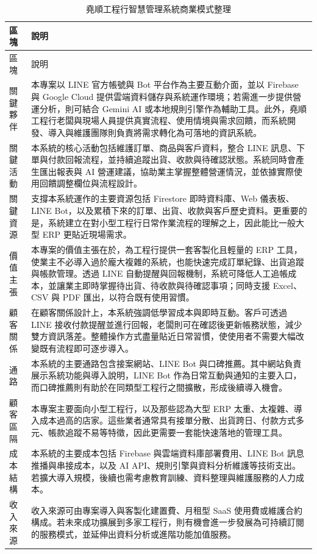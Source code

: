 \documentclass[12pt,a4paper,UTF8,fontset=none]{ctexart}
\begin{document}
\begin{longtable}{L{3.2cm}L{10.5cm}}
  \caption{堯順工程行智慧管理系統商業模式整理} \\
  \toprule
  區塊 & 說明 \\
  \midrule
  \endfirsthead
  \toprule
  區塊 & 說明 \\
  \midrule
  \endhead
  關鍵夥伴 &
  本專案以 LINE 官方帳號與 Bot 平台作為主要互動介面，並以 Firebase 與 Google Cloud 提供雲端資料儲存與系統運作環境；若需進一步提供營運分析，則可結合 Gemini AI 或本地規則引擎作為輔助工具。此外，堯順工程行老闆與現場人員提供真實流程、使用情境與需求回饋，而系統開發、導入與維護團隊則負責將需求轉化為可落地的資訊系統。 \\
  關鍵活動 &
  本系統的核心活動包括維護訂單、商品與客戶資料，整合 LINE 訊息、下單與付款回報流程，並持續追蹤出貨、收款與待確認狀態。系統同時會產生匯出報表與 AI 營運建議，協助業主掌握整體營運情況，並依據實際使用回饋調整欄位與流程設計。 \\
  關鍵資源 &
  支撐本系統運作的主要資源包括 Firestore 即時資料庫、Web 儀表板、LINE Bot，以及累積下來的訂單、出貨、收款與客戶歷史資料。更重要的是，系統建立在對小型工程行日常作業流程的理解之上，因此能比一般大型 ERP 更貼近現場需求。 \\
  價值主張 &
  本專案的價值主張在於，為工程行提供一套客製化且輕量的 ERP 工具，使業主不必導入過於龐大複雜的系統，也能快速完成訂單紀錄、出貨追蹤與帳款管理。透過 LINE 自動提醒與回報機制，系統可降低人工追帳成本，並讓業主即時掌握待出貨、待收款與待確認事項；同時支援 Excel、CSV 與 PDF 匯出，以符合既有使用習慣。 \\
  顧客關係 &
  在顧客關係設計上，本系統強調低學習成本與即時互動。客戶可透過 LINE 接收付款提醒並進行回報，老闆則可在確認後更新帳務狀態，減少雙方資訊落差。整體操作方式盡量貼近日常習慣，使使用者不需要大幅改變既有流程即可逐步導入。 \\
  通路 &
  本系統的主要通路包含接案網站、LINE Bot 與口碑推薦。其中網站負責展示系統功能與導入說明，LINE Bot 作為日常互動與通知的主要入口，而口碑推薦則有助於在同類型工程行之間擴散，形成後續導入機會。 \\
  顧客區隔 &
  本專案主要面向小型工程行，以及那些認為大型 ERP 太重、太複雜、導入成本過高的店家。這些業者通常具有接單分散、出貨跨日、付款方式多元、帳款追蹤不易等特徵，因此更需要一套能快速落地的管理工具。 \\
  成本結構 &
  本系統的主要成本包括 Firebase 與雲端資料庫部署費用、LINE Bot 訊息推播與串接成本，以及 AI API、規則引擎與資料分析維護等技術支出。若擴大導入規模，後續也需考慮教育訓練、資料整理與維護服務的人力成本。 \\
  收入來源 &
  收入來源可由專案導入與客製化建置費、月租型 SaaS 使用費或維護合約構成。若未來成功擴展到多家工程行，則有機會進一步發展為可持續訂閱的服務模式，並延伸出資料分析或進階功能加值服務。 \\
  \bottomrule
\end{longtable}
\end{document}
